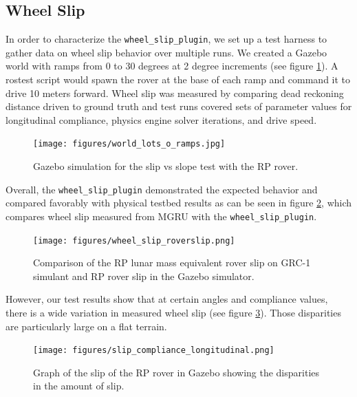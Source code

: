 \documentclass[twocolumn,letterpaper]{IEEEAerospaceCLS}  %
\begin{document}
\subsection{Wheel Slip}
In order to characterize the \texttt{wheel\_slip\_plugin}, we set up a test harness to gather data on wheel slip behavior over multiple runs. We created a Gazebo world with ramps from 0 to 30 degrees at 2 degree increments (see figure \ref{fig:simulationramps}). A rostest script would spawn the rover at the base of each ramp and command it to drive 10 meters forward. Wheel slip was measured by comparing dead reckoning distance driven to ground truth and test runs covered sets of parameter values for longitudinal compliance, physics engine solver iterations, and drive speed. 
\begin{figure}[h!]
	\texttt{[image: figures/world\_lots\_o\_ramps.jpg]}
   	\caption{Gazebo simulation for the slip vs slope test with the RP rover.}
    \label{fig:simulationramps}
\end{figure}
Overall, the \texttt{wheel\_slip\_plugin} demonstrated the expected behavior and compared favorably with physical testbed results as can be seen in figure \ref{fig:wheelsliptuningchart}, which compares wheel slip measured from MGRU with the  \texttt{wheel\_slip\_plugin}. 
\begin{figure}[h!]
	\texttt{[image: figures/wheel\_slip\_roverslip.png]}
   	\caption{Comparison of the RP lunar mass equivalent rover slip on GRC-1 simulant and RP rover slip in the Gazebo simulator.}
    \label{fig:wheelsliptuningchart}
\end{figure}

However, our test results show that at certain angles and compliance values, there is a wide variation in measured wheel slip (see figure \ref{fig:slipdisparities}). Those disparities are particularly large on a flat terrain.
\begin{figure}[h!]
	\texttt{[image: figures/slip\_compliance\_longitudinal.png]}
   	\caption{Graph of the slip of the RP rover in Gazebo showing the disparities in the amount of slip.}
    \label{fig:slipdisparities}
\end{figure}



\end{document}
